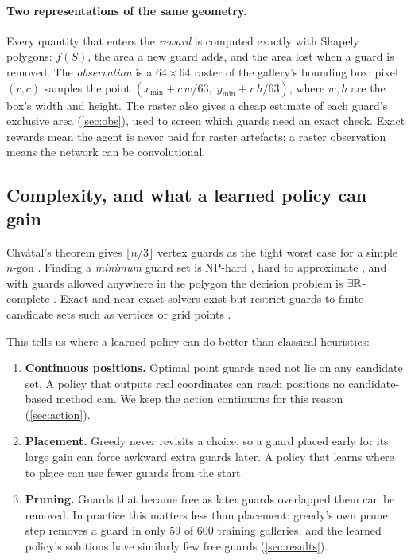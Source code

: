 \documentclass[11pt,a4paper]{article}
\begin{document}
\paragraph{Two representations of the same geometry.}
Every quantity that enters the \emph{reward} is computed exactly with Shapely polygons:
$f(S)$, the area a new guard adds, and the area lost when a guard is removed. The
\emph{observation} is a $64\times 64$ raster of the gallery's bounding box: pixel $(r,c)$
samples the point $(x_{\min} + c\,w/63,\; y_{\min} + r\,h/63)$, where $w, h$ are the box's
width and height. The raster also gives a cheap estimate of each guard's exclusive area
(\cref{sec:obs}), used to screen which guards need an exact check. Exact rewards mean the
agent is never paid for raster artefacts; a raster observation means the network can be
convolutional.

\subsection{Complexity, and what a learned policy can gain}\label{sec:complexity}

Chv\'atal's theorem gives $\lfloor n/3\rfloor$ vertex guards as the tight worst case for a
simple $n$-gon \cite{chvatal1975,fisk1978}. Finding a \emph{minimum} guard set is NP-hard
\cite{leelin1986}, hard to approximate \cite{eidenbenz2001}, and with guards allowed
anywhere in the polygon the decision problem is $\exists\mathbb{R}$-complete
\cite{abrahamsen2018}. Exact and near-exact solvers exist but restrict guards to finite
candidate sets such as vertices or grid points \cite{couto2011,tozoni2016}.

This tells us where a learned policy can do better than classical heuristics:
\begin{enumerate}
  \item \textbf{Continuous positions.} Optimal point guards need not lie on any candidate
        set. A policy that outputs real coordinates can reach positions no candidate-based
        method can. We keep the action continuous for this reason (\cref{sec:action}).
  \item \textbf{Placement.} Greedy never revisits a choice, so a guard placed early for its
        large gain can force awkward extra guards later. A policy that learns where to place
        can use fewer guards from the start.
  \item \textbf{Pruning.} Guards that became free as later guards overlapped them can be
        removed. In practice this matters less than placement: greedy's own prune step
        removes a guard in only $59$ of $600$ training galleries, and the learned policy's
        solutions have similarly few free guards (\cref{sec:results}).
\end{enumerate}
\end{document}
